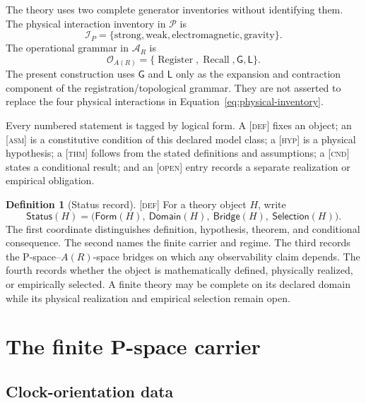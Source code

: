 \documentclass[11pt]{article}
\newcommand{\Pspace}{\ensuremath{\mathcal P}}
\newcommand{\ARspace}{\ensuremath{\mathcal A_R}}
\newcommand{\Status}{\ensuremath{\mathsf{Status}}}
\newcommand{\Register}{\operatorname{Register}}
\newcommand{\Recall}{\operatorname{Recall}}
\newcommand{\GOp}{\ensuremath{\mathsf G}}
\newcommand{\LOp}{\ensuremath{\mathsf L}}
\newcommand{\Defn}{\textsc{[def]}}
\newcommand{\Asm}{\textsc{[asm]}}
\newcommand{\Hyp}{\textsc{[hyp]}}
\newcommand{\Thm}{\textsc{[thm]}}
\newcommand{\Cnd}{\textsc{[cnd]}}
\newcommand{\Open}{\textsc{[open]}}
\theoremstyle{definition}
\newtheorem{definition}{Definition}[section]
\begin{document}
The theory uses two complete generator inventories without identifying them.
The physical interaction inventory in \Pspace{} is
\begin{equation}
\mathcal I_P=
\{\text{strong},\text{weak},\text{electromagnetic},\text{gravity}\}.
\label{eq:physical-inventory}
\end{equation}
The operational grammar in $\ARspace$ is
\begin{equation}
\mathcal O_{A(R)}=\{\Register,\Recall,\GOp,\LOp\}.
\label{eq:registration-grammar}
\end{equation}
The present construction uses $\GOp$ and $\LOp$ only as the expansion and
contraction component of the registration/topological grammar.  They are not
asserted to replace the four physical interactions in Equation~\eqref{eq:physical-inventory}.

Every numbered statement is tagged by logical form.  A \Defn{} fixes an object;
an \Asm{} is a constitutive condition of this declared model class; a \Hyp{} is a
physical hypothesis; a \Thm{} follows from the stated definitions and
assumptions; a \Cnd{} states a conditional result; and an \Open{} entry records a
separate realization or empirical obligation.

\begin{definition}[Status record]
\label{def:status}
\Defn{} For a theory object $H$, write
\begin{equation}
\Status(H)=\bigl(\mathsf{Form}(H),\ \mathsf{Domain}(H),\
\mathsf{Bridge}(H),\ \mathsf{Selection}(H)\bigr).
\label{eq:status}
\end{equation}
The first coordinate distinguishes definition, hypothesis, theorem, and
conditional consequence.  The second names the finite carrier and regime.  The
third records the P-space--$A(R)$-space bridges on which any observability claim
depends.  The fourth records whether the object is mathematically defined,
physically realized, or empirically selected.  A finite theory may be complete
on its declared domain while its physical realization and empirical selection
remain open.
\end{definition}

\section{The finite P-space carrier}
\label{sec:carrier}

\subsection{Clock-orientation data}
\end{document}
